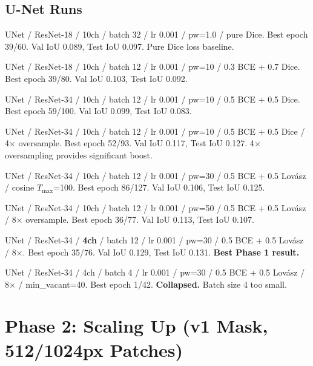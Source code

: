 \subsection{U-Net Runs}

\begin{description}[style=unboxed,leftmargin=0cm]
  \item[Run 006] UNet / ResNet-18 / 10ch / batch 32 / lr 0.001 / pw=1.0 / pure Dice.
    Best epoch 39/60. Val IoU 0.089, Test IoU 0.097. Pure Dice loss baseline.

  \item[Run 007] UNet / ResNet-18 / 10ch / batch 12 / lr 0.001 / pw=10 / 0.3 BCE + 0.7 Dice.
    Best epoch 39/80. Val IoU 0.103, Test IoU 0.092.

  \item[Run 009] UNet / ResNet-34 / 10ch / batch 12 / lr 0.001 / pw=10 / 0.5 BCE + 0.5 Dice.
    Best epoch 59/100. Val IoU 0.099, Test IoU 0.083.

  \item[Run 010] UNet / ResNet-34 / 10ch / batch 12 / lr 0.001 / pw=10 / 0.5 BCE + 0.5 Dice / 4$\times$ oversample.
    Best epoch 52/93. Val IoU 0.117, Test IoU 0.127. 4$\times$ oversampling provides significant boost.

  \item[Run 011] UNet / ResNet-34 / 10ch / batch 12 / lr 0.001 / pw=30 / 0.5 BCE + 0.5 Lov\'{a}sz / cosine $T_{\max}$=100.
    Best epoch 86/127. Val IoU 0.106, Test IoU 0.125.

  \item[Run 012] UNet / ResNet-34 / 10ch / batch 12 / lr 0.001 / pw=50 / 0.5 BCE + 0.5 Lov\'{a}sz / 8$\times$ oversample.
    Best epoch 36/77. Val IoU 0.113, Test IoU 0.107.

  \item[Run 013] UNet / ResNet-34 / \textbf{4ch} / batch 12 / lr 0.001 / pw=30 / 0.5 BCE + 0.5 Lov\'{a}sz / 8$\times$.
    Best epoch 35/76. Val IoU 0.129, Test IoU 0.131. \textbf{Best Phase 1 result.}

  \item[Run 014] UNet / ResNet-34 / 4ch / batch 4 / lr 0.001 / pw=30 / 0.5 BCE + 0.5 Lov\'{a}sz / 8$\times$ / min\_vacant=40.
    Best epoch 1/42. \textbf{Collapsed.} Batch size 4 too small.
\end{description}

\section{Phase 2: Scaling Up (v1 Mask, 512/1024px Patches)}

